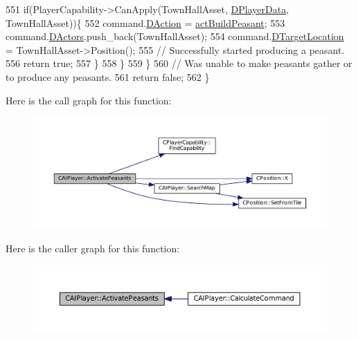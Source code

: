 \begin{DoxyCode}
551             \textcolor{keywordflow}{if}(PlayerCapability->CanApply(TownHallAsset, \hyperlink{classCAIPlayer_a83b5113c8f7e80df54940b647c5ee2e6}{DPlayerData}, TownHallAsset))\{
552                 command.\hyperlink{structSPlayerCommandRequest_a80897bbccf2c4e0b148a7aa815a926c6}{DAction} = \hyperlink{GameDataTypes_8h_a35b98ce26aca678b03c6f9f76e4778cea66c601dce0fc095460b3c2c25f66ee71}{actBuildPeasant};
553                 command.\hyperlink{structSPlayerCommandRequest_aa37fc01519676345703d78b9f573894a}{DActors}.push\_back(TownHallAsset);       
554                 command.\hyperlink{structSPlayerCommandRequest_a701702b94ca2fd2738e95ef6711dd41a}{DTargetLocation} = TownHallAsset->Position();
555                 \textcolor{comment}{// Successfully started producing a peasant.}
556                 \textcolor{keywordflow}{return} \textcolor{keyword}{true};
557             \}
558         \}
559     \}
560     \textcolor{comment}{// Was unable to make peasants gather or to produce any peasants.}
561     \textcolor{keywordflow}{return} \textcolor{keyword}{false};
562 \}
\end{DoxyCode}
Here is the call graph for this function\+:\nopagebreak
\begin{figure}[H]
\begin{center}
\leavevmode
\includegraphics[width=350pt]{classCAIPlayer_a3fab1c955fd68bb53fa80bb1872d2819_cgraph}
\end{center}
\end{figure}
Here is the caller graph for this function\+:\nopagebreak
\begin{figure}[H]
\begin{center}
\leavevmode
\includegraphics[width=350pt]{classCAIPlayer_a3fab1c955fd68bb53fa80bb1872d2819_icgraph}
\end{center}
\end{figure}
\hypertarget{classCAIPlayer_adf7feeba7debf9f19b000887616d7bfb}{}\label{classCAIPlayer_adf7feeba7debf9f19b000887616d7bfb} 
